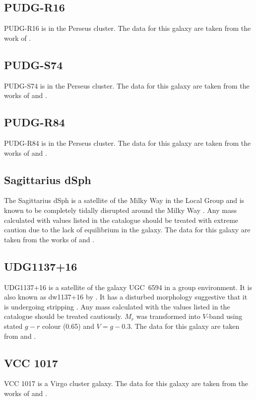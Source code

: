\subsection{PUDG-R16}
PUDG-R16 is in the Perseus cluster. The data for this galaxy are taken from the work of \citet{Gannon2022, Janssens2024}.

\subsection{PUDG-S74}
PUDG-S74 is in the Perseus cluster. The data for this galaxy are taken from the works of \citet{Gannon2022} and \citet{FerreMateu2023}. 

\subsection{PUDG-R84}
PUDG-R84 is in the Perseus cluster. The data for this galaxy are taken from the works of \citet{Gannon2022, Janssens2024} and \citet{FerreMateu2023}. 

\subsection{Sagittarius dSph}
The Sagittarius dSph is a satellite of the Milky Way in the Local Group and is known to be completely tidally disrupted around the Milky Way \citep{Ibata2001}. Any mass calculated with values listed in the catalogue should be treated with extreme caution due to the lack of equilibrium in the galaxy. The data for this galaxy are taken from the works of \citet{mcconnachie2012, Karachentsev2017} and \citet{Forbes2018}.

\subsection{UDG1137+16}
UDG1137+16 is a satellite of the galaxy UGC~6594 in a group environment. It is also known as dw1137+16 by \citet{Muller2018}. It has a disturbed morphology suggestive that it is undergoing stripping \citep{Gannon2021}. Any mass calculated with the values listed in the catalogue should be treated cautiously. $M_r$ was transformed into $V$-band using stated $g-r$ colour (0.65) and $V=g-0.3$. The data for this galaxy are taken from \citet{Gannon2021} and \citet{FerreMateu2023}.

\subsection{VCC 1017}
VCC 1017 is a Virgo cluster galaxy. The data for this galaxy are taken from the works of \citet{Lim2020} and \citet{Toloba2023}.

